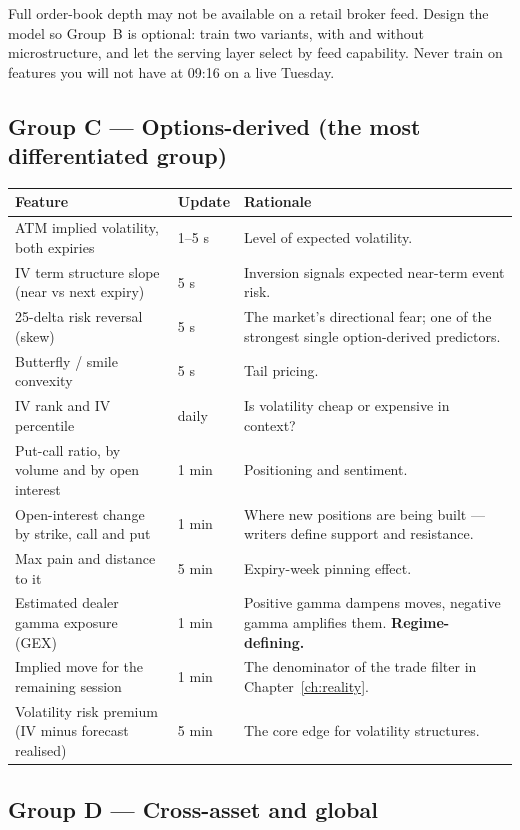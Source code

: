 \begin{warnbox}[title={Availability caveat}]
Full order-book depth may not be available on a retail broker feed. Design the
model so Group~B is optional: train two variants, with and without
microstructure, and let the serving layer select by feed capability. Never
train on features you will not have at 09:16 on a live Tuesday.
\end{warnbox}

\subsection{Group C --- Options-derived (the most differentiated group)}

\begin{longtable}{@{}p{4.8cm}p{3.4cm}p{6.0cm}@{}}
\toprule
\textbf{Feature} & \textbf{Update} & \textbf{Rationale}\\
\midrule
ATM implied volatility, both expiries & 1--5 s & Level of expected volatility.\\
IV term structure slope (near vs next expiry) & 5 s & Inversion signals expected
near-term event risk.\\
25-delta risk reversal (skew) & 5 s & The market's directional fear;
one of the strongest single option-derived predictors.\\
Butterfly / smile convexity & 5 s & Tail pricing.\\
IV rank and IV percentile & daily & Is volatility cheap or expensive in context?\\
Put-call ratio, by volume and by open interest & 1 min & Positioning and
sentiment.\\
Open-interest change by strike, call and put & 1 min & Where new positions are
being built --- writers define support and resistance.\\
Max pain and distance to it & 5 min & Expiry-week pinning effect.\\
Estimated dealer gamma exposure (GEX) & 1 min & Positive gamma dampens moves,
negative gamma amplifies them. \textbf{Regime-defining.}\\
Implied move for the remaining session & 1 min & The denominator of the trade
filter in Chapter~\ref{ch:reality}.\\
Volatility risk premium (IV minus forecast realised) & 5 min & The core edge for
volatility structures.\\
\bottomrule
\end{longtable}

\subsection{Group D --- Cross-asset and global}

